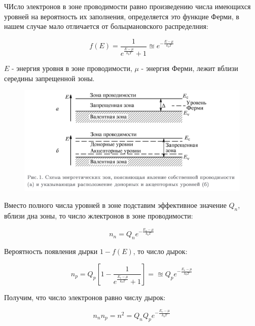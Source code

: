 \documentclass[a4paper]{article}
\begin{document}
ЧИсло электронов в зоне проводимости равно произведению числа имеющихся уровней на вероятность их заполнения, определяется это функцие Ферми, 
в нашем случае мало отличается от больцмановского распределния: 

\begin{equation}
    f(E) = \frac{1}{e^{\frac{E - \mu}{k_b T}}+1} \approxeq e^{- \frac{E - \mu}{k_b T}}
\end{equation}

$E$ - энергия уровня в зоне проводимости, $\mu$ - энергия Ферми, лежит вблизи середины запрещенной зоны. \par 

\begin{figure}[H]
    \begin{center}
        \includegraphics[scale = 0.5]{p1.png}
        \caption{}
        \label{p1}
    \end{center}
\end{figure}


Вместо полного числа уровней в зоне подставим эффективное значение $Q_n$, вблизи дна зоны, то число жлектронов в зоне проводимости:

\begin{equation}
    n_n = Q_n e^{- \frac{E_x - \mu}{k_b T}}
\end{equation}

Вероятность появления дырки $1-f(E)$, то число дырок:

\begin{equation}
    n_p = Q_p \left[ 1 - \frac{1}{e^{\frac{E_v - \mu}{k_bT}}+1} \right] =\approxeq Q_p e^{- \frac{E_v - \mu}{k_b T}}
\end{equation}


Получим, что число электронов равно числу дырок:

\begin{equation}
    n_n n_p = n^2 = Q_n Q_p e^{- \frac{E_v - \mu}{k_b T}}
\end{equation}
\end{document}
